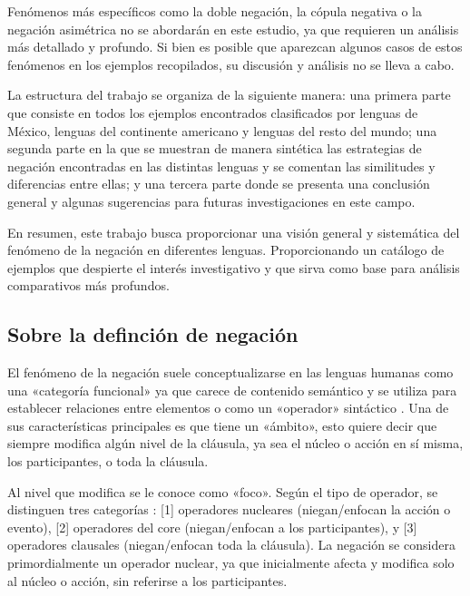 Fenómenos más específicos como la doble negación, la cópula negativa o la negación asimétrica no se abordarán en este estudio, ya que requieren un análisis más detallado y profundo. Si bien es posible que aparezcan algunos casos de estos fenómenos en los ejemplos recopilados, su discusión y análisis no se lleva a cabo.

La estructura del trabajo se organiza de la siguiente manera: una primera parte que consiste en todos los ejemplos encontrados clasificados por lenguas de México, lenguas del continente americano y lenguas del resto del mundo; una segunda parte en la que se muestran de manera sintética las estrategias de negación encontradas en las distintas lenguas y se comentan las similitudes y diferencias entre ellas; y una tercera parte donde se presenta una conclusión general y algunas sugerencias para futuras investigaciones en este campo.

En resumen, este trabajo busca proporcionar una visión general y sistemática del fenómeno de la negación en diferentes lenguas. Proporcionando un catálogo de ejemplos que despierte el interés investigativo y que sirva como base para análisis comparativos más profundos.

\subsection*{Sobre la definción de negación}

\noindent El fenómeno de la negación suele conceptualizarse en las lenguas humanas como una «categoría funcional» ya que carece de contenido semántico y se utiliza para establecer relaciones entre elementos o como un «operador» sintáctico \textcolor{MidnightBlue}{\citep{lawler,CasasNavarro2005}}. Una de sus características principales es que tiene un «ámbito», esto quiere decir que siempre modifica algún nivel de la cláusula, ya sea el núcleo o acción en sí misma, los participantes, o toda la cláusula.

Al nivel que modifica se le conoce como «foco». Según el tipo de operador, se distinguen tres categorías \textcolor{MidnightBlue}{\citep{Valin}}: [1] operadores nucleares (niegan/enfocan la acción o evento), [2] operadores del core (niegan/enfocan a los participantes), y [3] operadores clausales (niegan/enfocan toda la cláusula). La negación se considera primordialmente un operador nuclear, ya que inicialmente afecta y modifica solo al núcleo o acción, sin referirse a los participantes.

